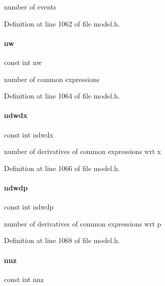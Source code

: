 number of events 

Definition at line 1062 of file model.\+h.

\mbox{\label{classamici_1_1_model_a196986a3a7c4a7dff1c90ae254db7795}} 
\paragraph{\texorpdfstring{nw}{nw}}
{\footnotesize\ttfamily const int nw}

number of common expressions 

Definition at line 1064 of file model.\+h.

\mbox{\label{classamici_1_1_model_a761315b22459d5ca307556f210aece6b}} 
\paragraph{\texorpdfstring{ndwdx}{ndwdx}}
{\footnotesize\ttfamily const int ndwdx}

number of derivatives of common expressions wrt x 

Definition at line 1066 of file model.\+h.

\mbox{\label{classamici_1_1_model_a1bd453ba21c508c3687f641d49430829}} 
\paragraph{\texorpdfstring{ndwdp}{ndwdp}}
{\footnotesize\ttfamily const int ndwdp}

number of derivatives of common expressions wrt p 

Definition at line 1068 of file model.\+h.

\mbox{\label{classamici_1_1_model_aab84622e454402438efd61cc36645abe}} 
\paragraph{\texorpdfstring{nnz}{nnz}}
{\footnotesize\ttfamily const int nnz}

